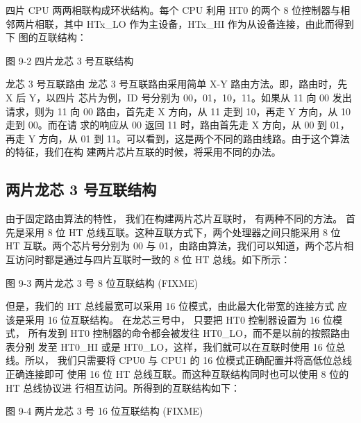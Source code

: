 四片 CPU 两两相联构成环状结构。每个 CPU 利用 HT0 的两个 8
位控制器与相 邻两片相联，其中 HTx\_LO 作为主设备，HTx\_HI
作为从设备连接，由此而得到下 图的互联结构：

图 9-2 四片龙芯 3 号互联结构

龙芯 3 号互联路由 龙芯 3 号互联路由采用简单 X-Y 路由方法。即，路由时，先 X 后
Y，以四片 芯片为例，ID 号分别为 00，01，10，11。如果从 11 向 00 发出请求，则为
11 向 00 路由，首先走 X 方向，从 11 走到 10，再走 Y 方向，从 10 走到 00。而在请
求的响应从 00 返回 11 时，路由首先走 X 方向，从 00 到 01，再走 Y 方向，从 01 到
11。可以看到，这是两个不同的路由线路。由于这个算法的特征，我们在构
建两片芯片互联的时候，将采用不同的办法。

\subsection{两片龙芯 3 号互联结构}

由于固定路由算法的特性， 我们在构建两片芯片互联时，
有两种不同的方法。 首先是采用 8 位 HT
总线互联。这种互联方式下，两个处理器之间只能采用 8 位 HT 互联。两个芯片号分别为
00 与 01，由路由算法，我们可以知道，两个芯片相
互访问时都是通过与四片互联时一致的 8 位 HT 总线。如下所示：

图 9-3 两片龙芯 3 号 8 位互联结构 (FIXME)

但是，我们的 HT 总线最宽可以采用 16 位模式，由此最大化带宽的连接方式 应该是采用
16 位互联结构。 在龙芯三号中， 只要把 HT0 控制器设置为 16 位模式， 所有发到 HT0
控制器的命令都会被发往 HT0\_LO，而不是以前的按照路由表分别 发至 HT0\_HI 或是
HT0\_LO，这样，我们就可以在互联时使用 16 位总线。所以， 我们只需要将 CPU0 与
CPU1 的 16 位模式正确配置并将高低位总线正确连接即可 使用 16 位 HT
总线互联。而这种互联结构同时也可以使用 8 位的 HT 总线协议进
行相互访问。所得到的互联结构如下：

图 9-4 两片龙芯 3 号 16 位互联结构 (FIXME)

